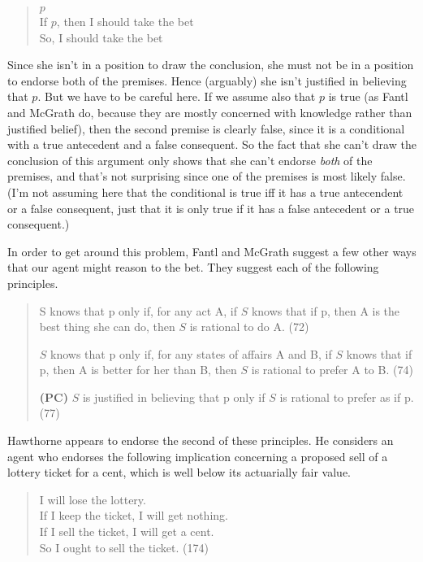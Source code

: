 \begin{quote}
\(p\) \\
If \(p\), then I should take the bet \\
So, I should take the bet
\end{quote}

\noindent Since she isn't in a position to draw the conclusion, she must not be in a position to endorse both of the premises. Hence (arguably) she isn't justified in believing that \(p\). But we have to be careful here. If we assume also that \(p\) is true (as Fantl and McGrath do, because they are mostly concerned with knowledge rather than justified belief), then the second premise is clearly false, since it is a conditional with a true antecedent and a false consequent. So the fact that she can't draw the conclusion of this argument only shows that she can't endorse \textit{both} of the premises, and that's not surprising since one of the premises is most likely false. (I'm not assuming here that the conditional is true iff it has a true antecendent or a false consequent, just that it is only true if it has a false antecedent or a true consequent.)

In order to get around this problem, Fantl and McGrath suggest a few other ways that our agent might reason to the bet. They suggest each of the following principles.

\begin{quote}
S knows that p only if, for any act A, if \(S\) knows that if p, then A is the best thing she can do, then \(S\) is rational to do A. (72)

\noindent \(S\) knows that p only if, for any states of affairs A and B, if \(S\) knows that if p, then A is better for her than B, then \(S\) is rational to prefer A to B. (74)

\noindent \textbf{(PC)} \(S\) is justified in believing that p only if \(S\) is rational to prefer as if p. (77)
\end{quote}

\noindent Hawthorne \citeyearpar[174-181]{Hawthorne2004} appears to endorse the second of these principles. He considers an agent who endorses the following implication concerning a proposed sell of a lottery ticket for a cent, which is well below its actuarially fair value.

\begin{quote}
I will lose the lottery. \\
\noindent If I keep the ticket, I will get nothing. \\
\noindent If I sell the ticket, I will get a cent. \\
\noindent So I ought to sell the ticket. (174)
\end{quote}

